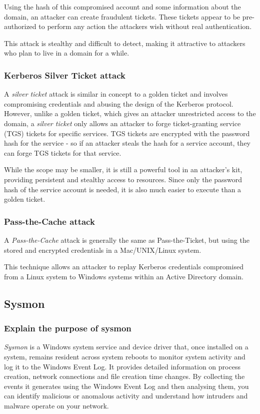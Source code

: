 Using the hash of this compromised account and some information about the domain, an attacker can create fraudulent tickets. These tickets appear to be pre-authorized to perform any action the attackers wish without real authentication.

This attack is stealthy and difficult to detect, making it attractive to attackers who plan to live in a domain for a while.

\subsubsection{Kerberos Silver Ticket attack}
A \textit{silver ticket} attack is similar in concept to a golden ticket and involves compromising credentials and abusing the design of the Kerberos protocol. However, unlike a golden ticket, which gives an attacker unrestricted access to the domain, a \textit{silver ticket} only allows an attacker to forge ticket-granting service (TGS) tickets for specific services. TGS tickets are encrypted with the password hash for the service - so if an attacker steals the hash for a service account, they can forge TGS tickets for that service.

While the scope may be smaller, it is still a powerful tool in an attacker's kit, providing persistent and stealthy access to resources. Since only the password hash of the service account is needed, it is also much easier to execute than a golden ticket.

\subsubsection{Pass-the-Cache attack}
A \textit{Pass-the-Cache} attack is generally the same as Pass-the-Ticket, but using the stored and encrypted credentials in a Mac/UNIX/Linux system.

This technique allows an attacker to replay Kerberos credentials compromised from a Linux system to Windows systems within an Active Directory domain.


\subsection{Sysmon}

\subsubsection{Explain the purpose of sysmon}
\textit{Sysmon} is a Windows system service and device driver that, once installed on a system, remains resident across system reboots to monitor system activity and log it to the Windows Event Log. It provides detailed information on process creation, network connections and file creation time changes. By collecting the events it generates using the Windows Event Log and then analysing them, you can identify malicious or anomalous activity and understand how intruders and malware operate on your network.

